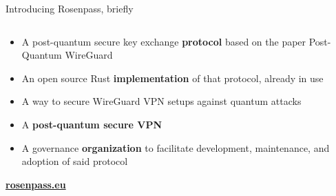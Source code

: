 \begin{frame}{Introducing Rosenpass, briefly}
  \begin{columns}[fullwidth,c]

    \begin{column}{.5\linewidth}
      \begin{itemize}
        \item A post-quantum secure key exchange \textbf{protocol}
          {\small based on the paper Post-Quantum WireGuard~\citePqwg}
        \item An open source Rust \textbf{implementation} of that protocol, already in use
        \item A way to secure WireGuard VPN setups against quantum attacks
        \item A \textbf{post-quantum secure VPN}
        \item A governance \textbf{organization} to facilitate development, maintenance, and adoption of said protocol
      \end{itemize}
      \bigskip
      \textbf{\url{rosenpass.eu}}
    \end{column}%
  \end{columns}
\end{frame}
